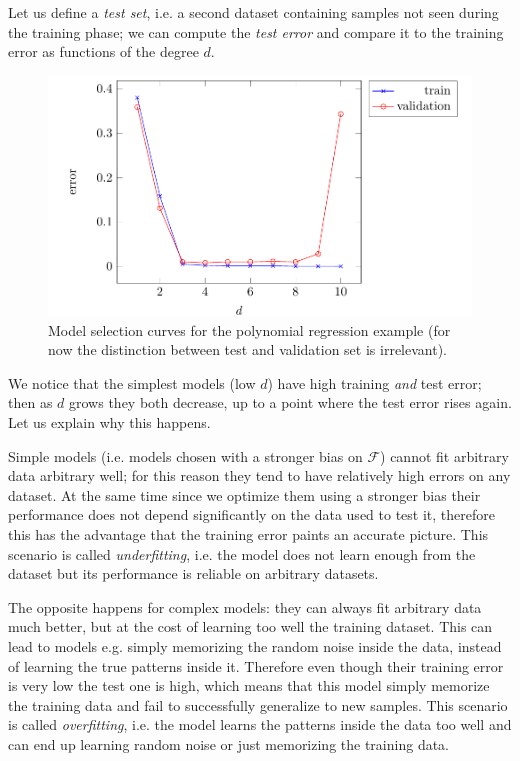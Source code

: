 Let us define a \emph{test set}, i.e. a second dataset containing samples not seen during the training phase; we can compute the \emph{test error} and compare it to the training error as functions of the degree $d$.
\begin{figure}[H]
    \centering
    \includegraphics[width=1.0\textwidth]{img/polinomio_curve.png}
    \caption{Model selection curves for the polynomial regression example (for now the distinction between test and validation set is irrelevant).}
\end{figure}
We notice that the simplest models (low $d$) have high training \emph{and} test error; then as $d$ grows they both decrease, up to a point where the test error rises again. Let us explain why this happens.

Simple models (i.e. models chosen with a stronger bias on $\mathcal{F}$) cannot fit arbitrary data arbitrary well; for this reason they tend to have relatively high errors on any dataset. At the same time since we optimize them using a stronger bias their performance does not depend significantly on the data used to test it, therefore this has the advantage that the training error paints an accurate picture. This scenario is called \emph{underfitting}, i.e. the model does not learn enough from the dataset but its performance is reliable on arbitrary datasets.

The opposite happens for complex models: they can always fit arbitrary data much better, but at the cost of learning too well the training dataset. This can lead to models e.g. simply memorizing the random noise inside the data, instead of learning the true patterns inside it. Therefore even though their training error is very low the test one is high, which means that this model simply memorize the training data and fail to successfully generalize to new samples. This scenario is called \emph{overfitting}, i.e. the model learns the patterns inside the data too well and can end up learning random noise or just memorizing the training data.

